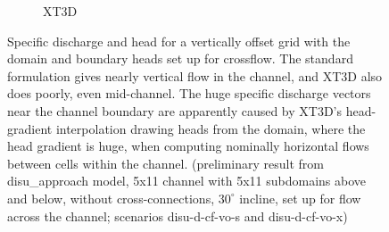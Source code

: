 \documentclass{article}
\begin{document}
\begin{figure}[H]
\begin{subfigure}{0.4\textwidth}
	\caption{XT3D}
	\label{fig:disu-x-nocc-cf-head}
\end{subfigure}
\caption{Specific discharge and head for a vertically offset grid with the domain and boundary heads set up for crossflow. The standard formulation gives nearly vertical flow in the channel, and XT3D also does poorly, even mid-channel. The huge specific discharge vectors near the channel boundary are apparently caused by XT3D's head-gradient interpolation drawing heads from the domain, where the head gradient is huge, when computing nominally horizontal flows between cells within the channel. (preliminary result from disu\_approach model, 5x11 channel with 5x11 subdomains above and below, without cross-connections, $30^{\circ}$ incline, set up for flow across the channel; scenarios disu-d-cf-vo-s and disu-d-cf-vo-x)}
\label{fig:figures}
\end{figure}
\end{document}
